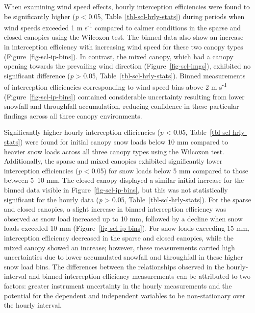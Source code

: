 \documentclass[
  letterpaper,
  DIV=11,
  numbers=noendperiod]{scrartcl}
\begin{document}
When examining wind speed effects, hourly interception efficiencies were
found to be significantly higher (\emph{p} \textless{} 0.05,
Table~\ref{tbl-scl-hrly-stats}) during periods when wind speeds exceeded
1 m s\textsuperscript{-1} compared to calmer conditions in the sparse
and closed canopies using the Wilcoxon test. The binned data also show
an increase in interception efficiency with increasing wind speed for
these two canopy types (Figure~\ref{fig-scl-ip-bins}). In contrast, the
mixed canopy, which had a canopy opening towards the prevailing wind
direction (Figure~\ref{fig-scl-imgs}), exhibited no significant
difference (\emph{p} \textgreater{} 0.05,
Table~\ref{tbl-scl-hrly-stats}). Binned measurements of interception
efficiencies corresponding to wind speed bins above 2 m
s\textsuperscript{-1} (Figure~\ref{fig-scl-ip-bins}) contained
considerable uncertainty resulting from lower snowfall and throughfall
accumulation, reducing confidence in these particular findings across
all three canopy environments.

Significantly higher hourly interception efficiencies (\emph{p}
\textless{} 0.05, Table~\ref{tbl-scl-hrly-stats}) were found for initial
canopy snow loads below 10 mm compared to heavier snow loads across all
three canopy types using the Wilcoxon test. Additionally, the sparse and
mixed canopies exhibited significantly lower interception efficiencies
(\emph{p} \textless{} 0.05) for snow loads below 5 mm compared to those
between 5--10 mm. The closed canopy displayed a similar initial increase
for the binned data visible in Figure~\ref{fig-scl-ip-bins}, but this
was not statistically significant for the hourly data (\emph{p}
\textgreater{} 0.05, Table~\ref{tbl-scl-hrly-stats}). For the sparse and
closed canopies, a slight increase in binned interception efficiency was
observed as snow load increased up to 10 mm, followed by a decline when
snow loads exceeded 10 mm (Figure~\ref{fig-scl-ip-bins}). For snow loads
exceeding 15 mm, interception efficiency decreased in the sparse and
closed canopies, while the mixed canopy showed an increase; however,
these measurements carried high uncertainties due to lower accumulated
snowfall and throughfall in these higher snow load bins. The differences
between the relationships observed in the hourly-interval and binned
interception efficiency measurements can be attributed to two factors:
greater instrument uncertainty in the hourly measurements and the
potential for the dependent and independent variables to be
non-stationary over the hourly interval.
\end{document}
